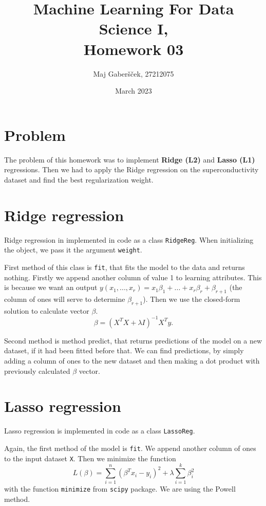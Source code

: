 \documentclass{article}
\title{Machine Learning For Data Science I, \\[0.1cm] Homework 03}
\author{Maj Gaberšček, 27212075}
\date{March 2023}
\begin{document}
\maketitle

\section{Problem}

The problem of this homework was to implement \textbf{Ridge (L2)} and \textbf{Lasso (L1)} regressions. Then we had to apply the Ridge regression on the superconductivity dataset and find the best regularization weight. 

\section{Ridge regression}

Ridge regression in implemented in code as a class \texttt{RidgeReg}. When initializing the object, we pass it the argument \texttt{weight}.

First method of this class is \texttt{fit}, that fits the model to the data and returns nothing. Firstly we append another column of value 1 to learning attributes. This is because we want an output $y(x_1, ..., x_r) = x_1 \beta_{1} + ... + x_r \beta_{r} + \beta_{r+1}$ (the column of ones will serve to determine $\beta_{r+1}$). Then we use the closed-form solution to calculate vector $\beta$.
$$\beta=(X^T X+ \lambda I)^{−1} X^T y.$$

Second method is method predict, that returns predictions of the model on a new dataset, if it had been fitted before that. We can find predictions, by simply adding a column of ones to the new dataset and then making a dot product with previously calculated $\beta$ vector. 

\section{Lasso regression}

Lasso regression is implemented in code as a class \texttt{LassoReg}.

Again, the first method of the model is \texttt{fit}. We append another column of ones to the input dataset \texttt{X}. Then we minimize the function 
$$L(\beta)= \sum_{i=1}^{n}{(\beta^T x_i - y_i)^2} + \lambda \sum_{i=1}^{k}{\beta_i^2}$$
with the function \texttt{minimize} from \texttt{scipy} package. We are using the Powell method. 
\end{document}
